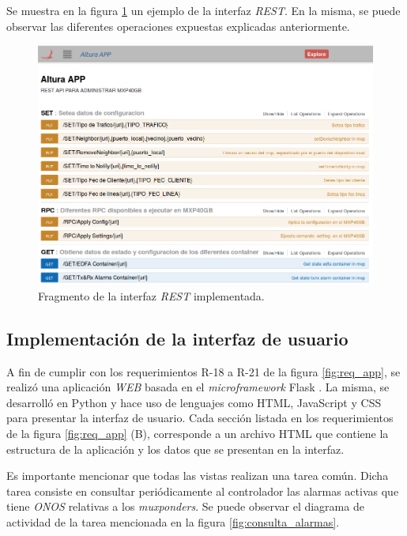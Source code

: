 Se muestra en la figura \ref{fig:rest_capt} un ejemplo de la interfaz \textit{REST}. En la misma, se puede observar las diferentes operaciones expuestas explicadas anteriormente.

\begin{figure}[H]
    \centering
    \includegraphics[scale=0.41]{Figures/captura-rest.png}
    \caption{Fragmento de la interfaz \textit{REST} implementada.}
    \label{fig:rest_capt}
  \end{figure}


  \subsection{Implementación de la interfaz de usuario}
  A fin de cumplir con los requerimientos R-18 a R-21 de la figura \ref{fig:req_app}, se realizó una aplicación \textit{WEB} basada en el \textit{microframework} Flask \parencite{flask}. La misma, se desarrolló en Python y hace uso de lenguajes como HTML, JavaScript y CSS para presentar la interfaz de usuario. Cada sección listada en los requerimientos de la figura \ref{fig:req_app} (B), corresponde a un archivo HTML que contiene la estructura de la aplicación y los datos que se presentan en la interfaz. 

Es importante mencionar que todas las vistas realizan una tarea común. Dicha tarea consiste en consultar periódicamente al controlador las alarmas activas que tiene \textit{ONOS} relativas a los \textit{muxponders}. Se puede observar el diagrama de actividad de la tarea mencionada en la figura \ref{fig:consulta_alarmas}.

